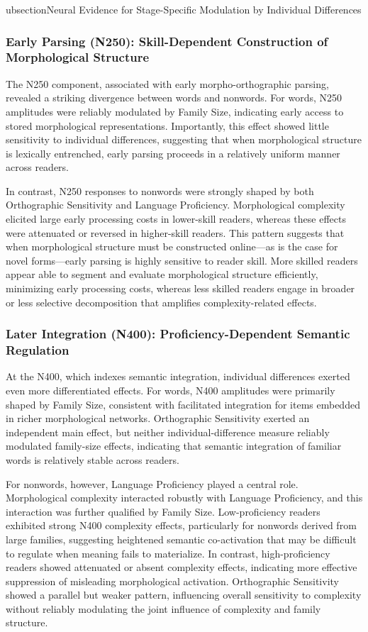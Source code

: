\documentclass[preprint,12pt, authoryear, review]{elsarticle}
\begin{document}
ubsection{Neural Evidence for Stage-Specific Modulation by Individual Differences}

\subsubsection{Early Parsing (N250): Skill-Dependent Construction of Morphological Structure}
The N250 component, associated with early morpho-orthographic parsing, revealed a striking divergence between words and nonwords. For words, N250 amplitudes were reliably modulated by Family Size, indicating early access to stored morphological representations. Importantly, this effect showed little sensitivity to individual differences, suggesting that when morphological structure is lexically entrenched, early parsing proceeds in a relatively uniform manner across readers.

In contrast, N250 responses to nonwords were strongly shaped by both Orthographic Sensitivity and Language Proficiency. Morphological complexity elicited large early processing costs in lower-skill readers, whereas these effects were attenuated or reversed in higher-skill readers. This pattern suggests that when morphological structure must be constructed online—as is the case for novel forms—early parsing is highly sensitive to reader skill. More skilled readers appear able to segment and evaluate morphological structure efficiently, minimizing early processing costs, whereas less skilled readers engage in broader or less selective decomposition that amplifies complexity-related effects.

\subsubsection{Later Integration (N400): Proficiency-Dependent Semantic Regulation}
At the N400, which indexes semantic integration, individual differences exerted even more differentiated effects. For words, N400 amplitudes were primarily shaped by Family Size, consistent with facilitated integration for items embedded in richer morphological networks. Orthographic Sensitivity exerted an independent main effect, but neither individual-difference measure reliably modulated family-size effects, indicating that semantic integration of familiar words is relatively stable across readers.

For nonwords, however, Language Proficiency played a central role. Morphological complexity interacted robustly with Language Proficiency, and this interaction was further qualified by Family Size. Low-proficiency readers exhibited strong N400 complexity effects, particularly for nonwords derived from large families, suggesting heightened semantic co-activation that may be difficult to regulate when meaning fails to materialize. In contrast, high-proficiency readers showed attenuated or absent complexity effects, indicating more effective suppression of misleading morphological activation. Orthographic Sensitivity showed a parallel but weaker pattern, influencing overall sensitivity to complexity without reliably modulating the joint influence of complexity and family structure.
\end{document}
